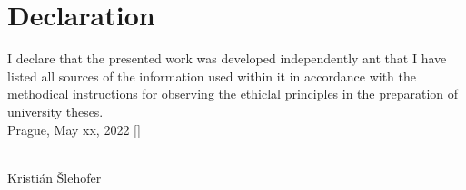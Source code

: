 \null\vfill{}
\section*{Declaration}
I declare that the presented work was developed independently ant that I have listed all sources of the information used within it in accordance with the methodical instructions for observing the ethiclal principles in the preparation of university theses.\\[0.5cm]

Prague, May xx, 2022		[\todo]
\bigskip
\bigskip
\bigskip 

\begin{flushright}  

 \begin{minipage}{0.35\textwidth} 
  \centering   
  \dotfill\\   
  Kristián Šlehofer
 \end{minipage}
\end{flushright}